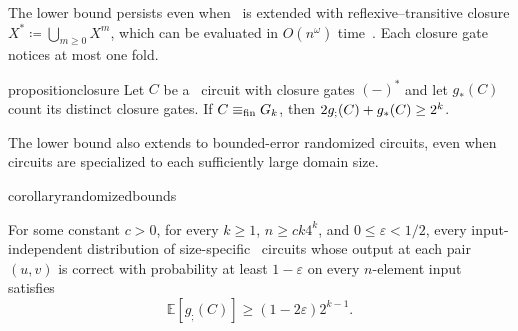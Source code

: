 The lower bound persists even when \CoR\ is extended with reflexive–transitive closure 
$X^* \coloneqq \bigcup_{m\ge 0}X^m$,
which can be evaluated in $O(n^\omega)$ time~\citep{fischer-meyer1971,munro1971,furman1970}.
Each closure gate notices at most one fold.


\begin{restatable}{proposition}{closure}\label{prop:star}
Let $C$ be a \CoR\ circuit with closure gates $(-)^*$
and let $g_*(C)$ count its distinct closure gates.
If $C\equiv_{\mathrm{fin}} G_k$, then $2g_{;}(C)+g_*(C)\ge2^k$.
\end{restatable}

The lower bound also extends to bounded-error randomized circuits, even when circuits are specialized to each sufficiently large domain size.

\begin{restatable}{corollary}{randomizedbounds}\label{cor:randomized}

For some constant $c>0$, for every $k\ge 1$, $n\ge ck4^k$, and $0\le\varepsilon<1/2$, every input-independent distribution of size-specific \CoR\ circuits whose output at each pair $(u,v)$ is correct with probability at least $1-\varepsilon$ on every $n$-element input satisfies
\[
\mathbb E[g_{;}(C)]\ge(1-2\varepsilon)2^{k-1}.
\]
\end{restatable}